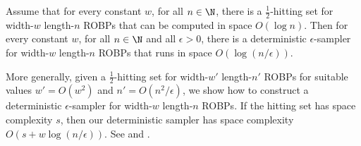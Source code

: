 \setcounter{theorem}{6}
\begin{theorem} \label{thm:const-width-main}
Assume that for every constant $w$, for all $n \in \N$, there is a $\frac{1}{2}$-hitting set for width-$w$ length-$n$ ROBPs that can be computed in space $O(\log n)$. Then for every constant $w$, for all $n \in \N$ and all $\epsilon > 0$, there is a deterministic $\epsilon$-sampler for width-$w$ length-$n$ ROBPs that runs in space $O(\log(n/\epsilon))$.
\end{theorem}

More generally, given a $\frac{1}{2}$-hitting set for width-$w'$ length-$n'$ ROBPs for suitable values $w' = O(w^2)$ and $n' = O(n^2/\epsilon)$, we show how to construct a deterministic $\epsilon$-sampler for width-$w$ length-$n$ ROBPs. If the hitting set has space complexity $s$, then our deterministic sampler has space complexity $O(s + w \log(n/\epsilon))$. See  and .
